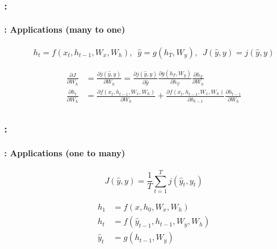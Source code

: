 \documentclass[xcolor=table]{beamer}
\begin{document}
\begin{frame}
	\frametitle{\insertshortsubtitle: \insertsection}
	\framesubtitle{\insertsubsection: Applications (many to one)}
	
	\vspace*{-0.5cm}
	\[ h_t = f(x_t, h_{t-1}, W_x, W_h),\,\,\, \hat{y} = g(h_T, W_y),\,\,\,  J(\hat{y}, y) = j(\hat{y}, y)\]
	
	\begin{minipage}{0.6\textwidth}\scriptsize
		\begin{align*}
			\frac{\partial J}{\partial W_h} &= \frac{\partial j(\hat{y}, y)}{\partial W_h}
			= \frac{\partial j(\hat{y}, y)}{\partial \hat{y}} 
			\frac{\partial g(h_T, W_y)}{\partial h_T} 
			\frac{\partial h_T}{\partial W_h} \\
			\frac{\partial h_t}{\partial W_h} &= 
			\frac{\partial f(x_t, h_{t-1}, W_x, W_h)}{\partial W_h} + 
			\frac{\partial f(x_t, h_{t-1}, W_x, W_h)}{\partial h_{t-1}} \frac{\partial h_{t-1}}{\partial W_h}\\
		\end{align*}
	\end{minipage}
	\begin{minipage}{0.38\textwidth}
	\end{minipage}

\end{frame}

\begin{frame}
	\frametitle{\insertshortsubtitle: \insertsection}
	\framesubtitle{\insertsubsection: Applications (one to many)}
	
	\vspace*{-0.5cm}
	\[ J(\hat{y}, y) = \frac{1}{T} \sum_{t=1}^{T} j(\hat{y}_{t}, y_t)\]
	
	\begin{minipage}{0.6\textwidth}
		\begin{align*}
			h_1 & = f(x, h_{0}, W_x, W_h) \\
			h_{t} & = f(\hat{y}_{t-1}, h_{t-1}, W_y, W_h) \\
			\hat{y}_{t} & = g(h_{t-1}, W_y) \\
		\end{align*}
	\end{minipage}
	\begin{minipage}{0.38\textwidth}
	\end{minipage}

\end{frame}
\end{document}
